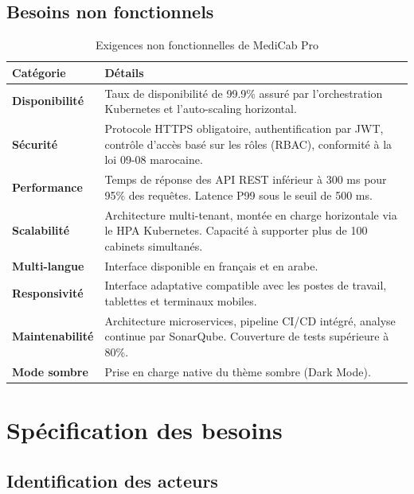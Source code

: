 \subsection{Besoins non fonctionnels}

\begin{table}[H]
\centering
\caption{Exigences non fonctionnelles de MediCab Pro}
\label{tab:nonfonctionnels}
\renewcommand{\arraystretch}{1.4}
\begin{tabularx}{\textwidth}{|>{\bfseries}p{3.5cm}|X|}
\hline
\textbf{Catégorie} & \textbf{Détails} \\
\hline
Disponibilité &
  Taux de disponibilité de 99.9\% assuré par l'orchestration Kubernetes
  et l'auto-scaling horizontal. \\
\hline
Sécurité &
  Protocole HTTPS obligatoire, authentification par JWT, contrôle d'accès
  basé sur les rôles (RBAC), conformité à la loi 09-08 marocaine. \\
\hline
Performance &
  Temps de réponse des API REST inférieur à 300 ms pour 95\% des requêtes.
  Latence P99 sous le seuil de 500 ms. \\
\hline
Scalabilité &
  Architecture multi-tenant, montée en charge horizontale via le HPA
  Kubernetes. Capacité à supporter plus de 100 cabinets simultanés. \\
\hline
Multi-langue &
  Interface disponible en français et en arabe. \\
\hline
Responsivité &
  Interface adaptative compatible avec les postes de travail, tablettes
  et terminaux mobiles. \\
\hline
Maintenabilité &
  Architecture microservices, pipeline CI/CD intégré, analyse continue
  par SonarQube. Couverture de tests supérieure à 80\%. \\
\hline
Mode sombre &
  Prise en charge native du thème sombre (Dark Mode). \\
\hline
\end{tabularx}
\end{table}

\section{Spécification des besoins}

\subsection{Identification des acteurs}

